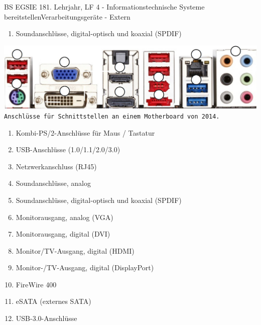 \documentclass[oneside,openany,headings=optiontotoc,11pt,numbers=noenddot]{article}
\begin{document}
\begin{worksheet}{BS EGSIE 18}{1. Lehrjahr, LF 4 - Informationstechnische Systeme bereitstellen}{Verarbeitungsgeräte - Extern}
\begin{enumerate}
			\item Soundanschlüsse, digital-optisch und koaxial (SPDIF)\\
		\end{enumerate}
		\par\noindent
		\includegraphics[width=\textwidth]{../99_Bilder/MB14.jpg}\\
		\texttt{Anschlüsse für Schnittstellen an einem Motherboard von 2014.}
		\begin{enumerate}
			\item Kombi-PS/2-Anschlüsse für Maus / Tastatur\\
			
			\setcounter{enumi}{3}
			
			\item USB-Anschlüsse (1.0/1.1/2.0/3.0)\\
			
			\item Netzwerkanschluss (RJ45)\\
			
			\item Soundanschlüsse, analog\\
			
			\item Soundanschlüsse, digital-optisch und koaxial (SPDIF)\\
			
			\item Monitorausgang, analog (VGA)\\
			
			\item Monitorausgang, digital (DVI)\\
			
			\item Monitor/TV-Ausgang, digital (HDMI)\\
			
			\item Monitor-/TV-Ausgang, digital (DisplayPort)\\
			
			\item FireWire 400\\
			
			\item eSATA (externes SATA)\\
			
			\item USB-3.0-Anschlüsse
		\end{enumerate}
	\end{worksheet}
\end{document}
